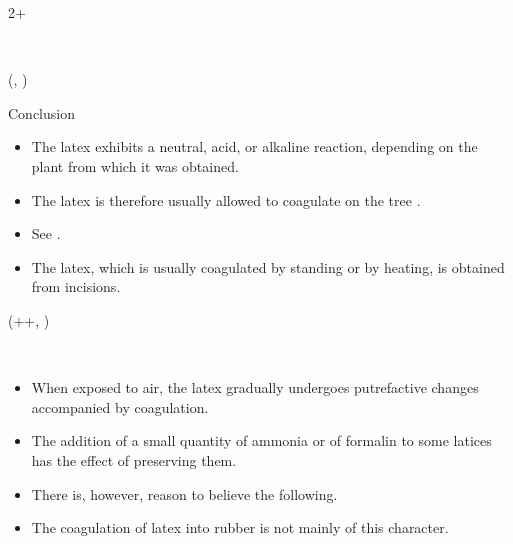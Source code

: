 \documentclass{beamer}
\newlength{\blockFour}
\begin{document}
\begin{frame}[t]
\begin{textblock*}{2\colwidth+\colsep}
\begin{block}{~}
\end{block}

\end{textblock*}




\begin{textblock*}{\colwidth}(\leftmargin, \blockFour)

\begin{block}{Conclusion}
\vspace{-0.333333\baselineskip}
\begin{itemize}
	\item The latex exhibits a neutral, acid, or alkaline reaction, depending on the plant from which it was obtained.
	\item The latex is therefore usually allowed to coagulate on the tree \citep{Koszegi2013}.
	\item See \cite{Bordalo2013, Dohmen2012}.
	\item The latex, which is usually coagulated by standing or by heating, is obtained from incisions.
\end{itemize}	
\end{block}

\end{textblock*}




\begin{textblock*}{\colwidth}(\leftmargin+\colwidth+\colsep, \blockFour)

\begin{block}{~}
\vspace{-0.333333\baselineskip}
\begin{itemize}
	\item When exposed to air, the latex gradually undergoes putrefactive changes accompanied by coagulation.
	\item The addition of a small quantity of ammonia or of formalin to some latices has the effect of preserving them.
	\item There is, however, reason to believe the following.
	\item The coagulation of latex into rubber is not mainly of this character.
\end{itemize}
\end{block}

\end{textblock*}



\end{frame}
\end{document}
